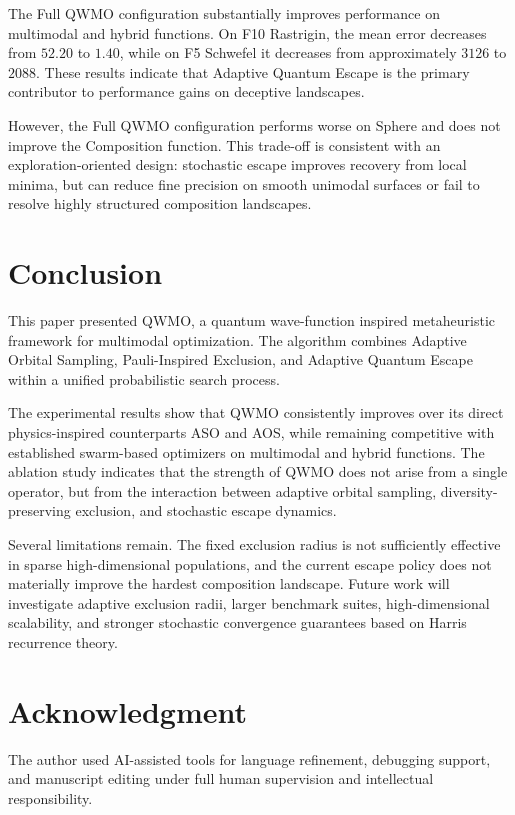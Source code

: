 \documentclass[final,5p,times,twocolumn]{elsarticle}
\begin{document}
The Full QWMO configuration substantially improves performance
on multimodal and hybrid functions. On F10 Rastrigin, the mean
error decreases from $52.20$ to $1.40$, while on F5 Schwefel it
decreases from approximately $3126$ to $2088$. These results
indicate that Adaptive Quantum Escape is the primary contributor
to performance gains on deceptive landscapes.

However, the Full QWMO configuration performs worse on Sphere
and does not improve the Composition function. This trade-off
is consistent with an exploration-oriented design: stochastic
escape improves recovery from local minima, but can reduce
fine precision on smooth unimodal surfaces or fail to resolve
highly structured composition landscapes.


\section{Conclusion}
\label{sec:conclusion}

This paper presented QWMO, a quantum wave-function inspired
metaheuristic framework for multimodal optimization. The
algorithm combines Adaptive Orbital Sampling, Pauli-Inspired
Exclusion, and Adaptive Quantum Escape within a unified
probabilistic search process.

The experimental results show that QWMO consistently improves
over its direct physics-inspired counterparts ASO and AOS, while
remaining competitive with established swarm-based optimizers
on multimodal and hybrid functions. The ablation study indicates
that the strength of QWMO does not arise from a single operator,
but from the interaction between adaptive orbital sampling,
diversity-preserving exclusion, and stochastic escape dynamics.

Several limitations remain. The fixed exclusion radius is not
sufficiently effective in sparse high-dimensional populations,
and the current escape policy does not materially improve the
hardest composition landscape. Future work will investigate
adaptive exclusion radii, larger benchmark suites, high-dimensional
scalability, and stronger stochastic convergence guarantees based
on Harris recurrence theory.


\section*{Acknowledgment}

The author used AI-assisted tools for language refinement,
debugging support, and manuscript editing under full human
supervision and intellectual responsibility.




\end{document}
